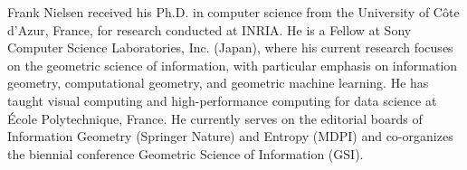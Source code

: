 Frank Nielsen received his Ph.D. in computer science from the University of C\^ote d’Azur, France, 
for research conducted at INRIA. He is a Fellow at Sony Computer Science Laboratories, Inc. (Japan), 
where his current research focuses on the geometric science of information, 
with particular emphasis on information geometry, computational geometry, and geometric machine learning. 
He has taught visual computing and high-performance computing for data science at \'Ecole Polytechnique, France. 
He currently serves on the editorial boards of Information Geometry (Springer Nature) and Entropy (MDPI)
and co-organizes the biennial conference Geometric Science of Information (GSI).